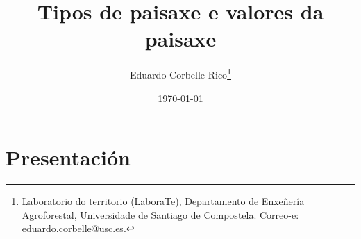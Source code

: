 \documentclass[11pt,a4paper]{article}
\title{Tipos de paisaxe e valores da paisaxe}
\author{Eduardo Corbelle Rico\thanks{Laboratorio do territorio (LaboraTe), Departamento de Enxe\~nería Agroforestal, Universidade de Santiago de Compostela. Correo-e: \href{mailto:eduardo.corbelle@usc.es}{eduardo.corbelle@usc.es}.}}
\date{\today}
\begin{document}
\maketitle




\section{Presentación}



\begin{landscape}
 \begin{footnotesize}














 
 \end{footnotesize}
\end{landscape}
\end{document}
